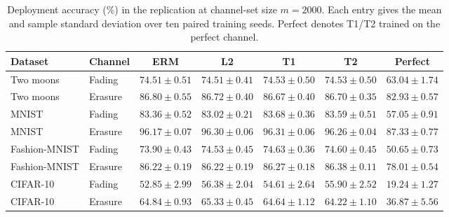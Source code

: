 \begin{table}[t]
\centering
\caption{Deployment accuracy (\%) in the replication at channel-set size $m=2000$. Each entry gives the mean and sample standard deviation over ten paired training seeds. Perfect denotes T1/T2 trained on the perfect channel.}
\label{tab:replication-accuracy}
\begin{tabular*}{\linewidth}{@{\extracolsep{\fill}}llccccc@{}}
\toprule
Dataset & Channel & ERM & L2 & T1 & T2 & Perfect \\
\midrule
Two moons & Fading & \(74.51\pm0.51\) & \(74.51\pm0.41\) & \(74.53\pm0.50\) & \(74.53\pm0.50\) & \(63.04\pm1.74\) \\
Two moons & Erasure & \(86.80\pm0.55\) & \(86.72\pm0.40\) & \(86.67\pm0.40\) & \(86.70\pm0.35\) & \(82.93\pm0.57\) \\
MNIST & Fading & \(83.36\pm0.52\) & \(83.02\pm0.21\) & \(83.68\pm0.36\) & \(83.59\pm0.51\) & \(57.05\pm0.91\) \\
MNIST & Erasure & \(96.17\pm0.07\) & \(96.30\pm0.06\) & \(96.31\pm0.06\) & \(96.26\pm0.04\) & \(87.33\pm0.77\) \\
Fashion-MNIST & Fading & \(73.90\pm0.43\) & \(74.53\pm0.45\) & \(74.63\pm0.36\) & \(74.60\pm0.45\) & \(50.65\pm0.73\) \\
Fashion-MNIST & Erasure & \(86.22\pm0.19\) & \(86.22\pm0.19\) & \(86.27\pm0.18\) & \(86.38\pm0.11\) & \(78.01\pm0.54\) \\
CIFAR-10 & Fading & \(52.85\pm2.99\) & \(56.38\pm2.04\) & \(54.61\pm2.64\) & \(55.90\pm2.52\) & \(19.24\pm1.27\) \\
CIFAR-10 & Erasure & \(64.84\pm0.93\) & \(65.33\pm0.45\) & \(64.64\pm1.12\) & \(64.22\pm1.10\) & \(36.87\pm5.56\) \\
\bottomrule
\end{tabular*}
\end{table}
